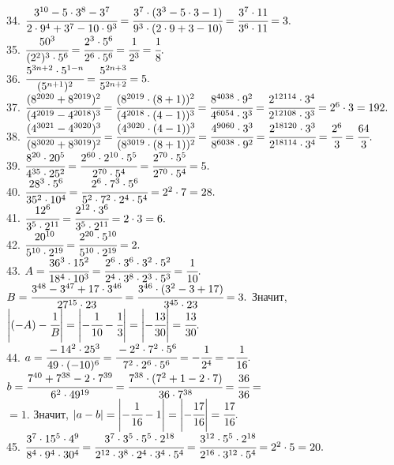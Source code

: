 34. $\cfrac{3^{10}-5\cdot3^8-3^7}{2\cdot9^4+3^7-10\cdot9^3}=\cfrac{3^7\cdot(3^3-5\cdot3-1)}{9^3\cdot(2\cdot9+3-10)}=
\cfrac{3^7\cdot11}{3^6\cdot11}=3.$\\
35. $\cfrac{50^3}{(2^2)^3\cdot5^6}=\cfrac{2^3\cdot5^6}{2^6\cdot5^6}=\cfrac{1}{2^3}=\cfrac{1}{8}.$\\
36. $\cfrac{5^{3n+2}\cdot5^{1-n}}{(5^{n+1})^2}=\cfrac{5^{2n+3}}{5^{2n+2}}=5.$\\
37. $\cfrac{(8^{2020}+8^{2019})^2}{(4^{2019}-4^{2018})^3}=\cfrac{(8^{2019}\cdot(8+1))^2}{(4^{2018}\cdot(4-1))^3}=
\cfrac{8^{4038}\cdot9^2}{4^{6054}\cdot3^3}=\cfrac{2^{12114}\cdot3^4}{2^{12108}\cdot3^3}=2^6\cdot3=192.$\\
38. $\cfrac{(4^{3021}-4^{3020})^3}{(8^{3020}+8^{3019})^2}=\cfrac{(4^{3020}\cdot(4-1))^3}{(8^{3019}\cdot(8+1))^2}=
\cfrac{4^{9060}\cdot3^3}{8^{6038}\cdot9^2}=\cfrac{2^{18120}\cdot3^3}{2^{18114}\cdot3^4}=\cfrac{2^6}{3}=\cfrac{64}{3}.$\\
39. $\cfrac{8^{20}\cdot20^5}{4^{35}\cdot25^2}=\cfrac{2^{60}\cdot2^{10}\cdot5^5}{2^{70}\cdot5^4}=
\cfrac{2^{70}\cdot5^5}{2^{70}\cdot5^4}=5.$\\
40. $\cfrac{28^3\cdot5^6}{35^2\cdot10^4}=\cfrac{2^6\cdot7^3\cdot5^6}{5^2\cdot7^2\cdot2^4\cdot5^4}=2^2\cdot7=28.$\\
41. $\cfrac{12^6}{3^5\cdot2^{11}}=\cfrac{2^{12}\cdot3^6}{3^5\cdot2^{11}}=2\cdot3=6.$\\
42. $\cfrac{20^{10}}{5^{10}\cdot2^{19}}=\cfrac{2^{20}\cdot5^{10}}{5^{10}\cdot2^{19}}=2.$\\
43. $A=\cfrac{36^3\cdot15^2}{18^4\cdot10^3}=\cfrac{2^6\cdot3^6\cdot3^2\cdot5^2}{2^4\cdot3^8\cdot2^3\cdot5^3}=\cfrac{1}{10}.$
$B=\cfrac{3^{48}-3^{47}+17\cdot3^{46}}{27^{15}\cdot23}=\cfrac{3^{46}\cdot(3^2-3+17)}{3^{45}\cdot23}=3.$ Значит, $\left|(-A)-\cfrac{1}{B}\right|=
\left|-\cfrac{1}{10}-\cfrac{1}{3}\right|=\left|-\cfrac{13}{30}\right|=\cfrac{13}{30}.$\\
44. $a=\cfrac{-14^2\cdot25^3}{49\cdot(-10)^6}=\cfrac{-2^2\cdot7^2\cdot5^6}{7^2\cdot2^6\cdot5^6}=-\cfrac{1}{2^4}=-\cfrac{1}{16}.$
$b=\cfrac{7^{40}+7^{38}-2\cdot7^{39}}{6^2\cdot49^{19}}=\cfrac{7^{38}\cdot(7^2+1-2\cdot7)}{36\cdot7^{38}}=
\cfrac{36}{36}=$\\$=1.$ Значит, $|a-b|=\left|-\cfrac{1}{16}-1\right|=\left|-\cfrac{17}{16}\right|=\cfrac{17}{16}.$\\
45. $\cfrac{3^7\cdot15^5\cdot4^9}{8^4\cdot9^4\cdot30^4}=\cfrac{3^7\cdot3^5\cdot5^5\cdot2^{18}}{2^{12}\cdot3^8\cdot2^4\cdot3^4\cdot5^4}=
\cfrac{3^{12}\cdot5^5\cdot2^{18}}{2^{16}\cdot3^{12}\cdot5^4}=2^2\cdot5=20.$\\
